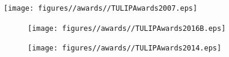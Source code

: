 \documentclass{tikzposter} %
\begin{document}
\begin{columns}
{\begin{minipage}{\linewidth}
\begin{multicols}{3}
				\begin{minipage}{\linewidth}
					\texttt{[image: figures//awards//TULIPAwards2007.eps]}
				\end{minipage}				
				
				\begin{minipage}{\linewidth}
				\begin{figure}[H] 
					\begin{minipage}{\linewidth}
					\subfigure
					{ 
						\texttt{[image: figures//awards//TULIPAwards2016B.eps]}
					}
					\end{minipage}
					\begin{minipage}{\linewidth}
					\subfigure
					{
						\texttt{[image: figures//awards//TULIPAwards2014.eps]}
					}
					\end{minipage}
				\end{figure}	
				\end{minipage}	
				\end{multicols}
			\end{minipage}
		}
		
		
		
		
		
	\end{columns}
	
	
	
\end{document}
